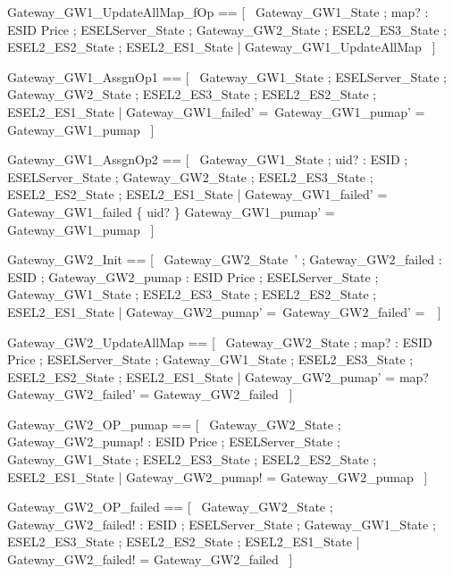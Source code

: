 \documentclass{article}
\begin{document}
\begin{zed}
	Gateway\_GW1\_UpdateAllMap\_fOp == [~  \Xi Gateway\_GW1\_State ; map? : ESID \pfun Price ; \Xi ESELServer\_State ; \Xi Gateway\_GW2\_State ; \Xi ESEL2\_ES3\_State ; \Xi ESEL2\_ES2\_State ; \Xi ESEL2\_ES1\_State | \lnot \pre Gateway\_GW1\_UpdateAllMap  ~]
\end{zed}

\begin{zed}
	Gateway\_GW1\_AssgnOp1 == [~  \Delta Gateway\_GW1\_State ; \Xi ESELServer\_State ; \Xi Gateway\_GW2\_State ; \Xi ESEL2\_ES3\_State ; \Xi ESEL2\_ES2\_State ; \Xi ESEL2\_ES1\_State | Gateway\_GW1\_failed' =~\emptyset \land Gateway\_GW1\_pumap' = Gateway\_GW1\_pumap  ~]
\end{zed}

\begin{zed}
	Gateway\_GW1\_AssgnOp2 == [~  \Delta Gateway\_GW1\_State ; uid? : ESID ; \Xi ESELServer\_State ; \Xi Gateway\_GW2\_State ; \Xi ESEL2\_ES3\_State ; \Xi ESEL2\_ES2\_State ; \Xi ESEL2\_ES1\_State | Gateway\_GW1\_failed' = Gateway\_GW1\_failed \cup \{ uid? \} \land Gateway\_GW1\_pumap' = Gateway\_GW1\_pumap  ~]
\end{zed}

\begin{zed}
	Gateway\_GW2\_Init == [~  Gateway\_GW2\_State~' ; Gateway\_GW2\_failed : \power ESID ; Gateway\_GW2\_pumap : ESID \pfun Price ; \Xi ESELServer\_State ; \Xi Gateway\_GW1\_State ; \Xi ESEL2\_ES3\_State ; \Xi ESEL2\_ES2\_State ; \Xi ESEL2\_ES1\_State | Gateway\_GW2\_pumap' =~\emptyset \land Gateway\_GW2\_failed' =~\emptyset  ~]
\end{zed}

\begin{zed}
	Gateway\_GW2\_UpdateAllMap == [~  \Delta Gateway\_GW2\_State ; map? : ESID \pfun Price ; \Xi ESELServer\_State ; \Xi Gateway\_GW1\_State ; \Xi ESEL2\_ES3\_State ; \Xi ESEL2\_ES2\_State ; \Xi ESEL2\_ES1\_State | Gateway\_GW2\_pumap' = map? \land Gateway\_GW2\_failed' = Gateway\_GW2\_failed  ~]
\end{zed}

\begin{zed}
	Gateway\_GW2\_OP\_pumap == [~  \Xi Gateway\_GW2\_State ; Gateway\_GW2\_pumap! : ESID \pfun Price ; \Xi ESELServer\_State ; \Xi Gateway\_GW1\_State ; \Xi ESEL2\_ES3\_State ; \Xi ESEL2\_ES2\_State ; \Xi ESEL2\_ES1\_State | Gateway\_GW2\_pumap! = Gateway\_GW2\_pumap  ~]
\end{zed}

\begin{zed}
	Gateway\_GW2\_OP\_failed == [~  \Xi Gateway\_GW2\_State ; Gateway\_GW2\_failed! : \power ESID ; \Xi ESELServer\_State ; \Xi Gateway\_GW1\_State ; \Xi ESEL2\_ES3\_State ; \Xi ESEL2\_ES2\_State ; \Xi ESEL2\_ES1\_State | Gateway\_GW2\_failed! = Gateway\_GW2\_failed  ~]
\end{zed}
\end{document}
